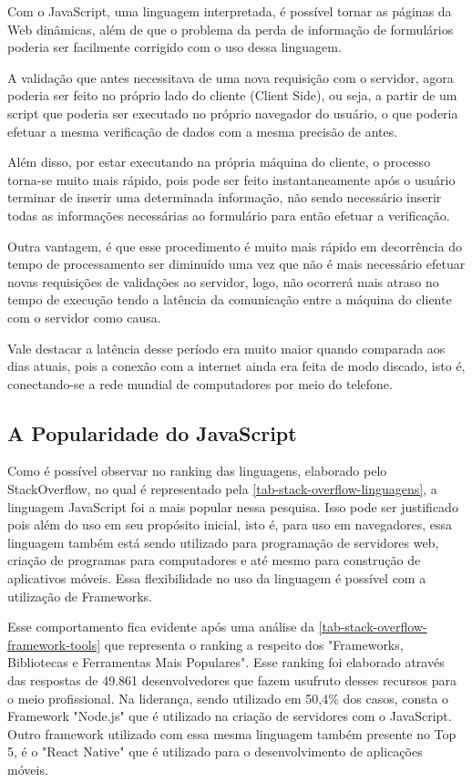 Com o JavaScript, uma linguagem interpretada, é possível tornar as páginas da Web dinâmicas, além de que o problema da perda de informação de formulários poderia ser facilmente corrigido com o uso dessa linguagem.

A validação que antes necessitava de uma nova requisição com o servidor, agora poderia ser feito no próprio lado do cliente (Client Side), ou seja, a partir de um script que poderia ser executado no próprio navegador do usuário, o que poderia efetuar a mesma verificação de dados com a mesma precisão de antes.

Além disso, por estar executando na própria máquina do cliente, o processo torna-se muito mais rápido, pois pode ser feito instantaneamente após o usuário terminar de inserir uma determinada informação, não sendo necessário inserir todas as informações necessárias ao formulário para então efetuar a verificação.

Outra vantagem, é que esse procedimento é muito mais rápido em decorrência do tempo de processamento ser diminuído uma vez que não é mais necessário efetuar novas requisições de validações ao servidor, logo, não ocorrerá mais atraso no tempo de execução tendo a latência da comunicação entre a máquina do cliente com o servidor como causa.

Vale destacar a latência desse período era muito maior quando comparada aos dias atuais, pois a conexão com a internet ainda era feita de modo discado, isto é, conectando-se a rede mundial de computadores por meio do telefone.

\subsection{A Popularidade do JavaScript}
\label{secao-javascript-popularidade}

Como é possível observar no ranking das linguagens, elaborado pelo StackOverflow, no qual é representado pela \autoref{tab-stack-overflow-linguagens}, a linguagem JavaScript foi a mais popular nessa pesquisa. Isso pode ser justificado pois além do uso em seu propósito inicial, isto é, para uso em navegadores, essa linguagem também está sendo utilizado para programação de servidores web, criação de programas para computadores e até mesmo para construção de aplicativos móveis. Essa flexibilidade no uso da linguagem é possível com a utilização de Frameworks.

Esse comportamento fica evidente após uma análise da \autoref{tab-stack-overflow-framework-tools} que representa o ranking a respeito dos "Frameworks, Bibliotecas e Ferramentas Mais Populares". Esse ranking foi elaborado através das respostas de 49.861 desenvolvedores que fazem usufruto desses recursos para o meio profissional. Na liderança, sendo utilizado em 50,4\% dos casos, consta o Framework "Node.js" que é utilizado na criação de servidores com o JavaScript. Outro framework utilizado com essa mesma linguagem também presente no Top 5, é o "React Native" que é utilizado para o desenvolvimento de aplicações móveis.

